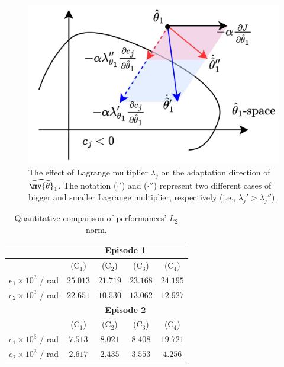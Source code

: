 \documentclass[lettersize,journal]{IEEEtran}
\begin{document}
\begin{figure}[!t]
	\centering
	\includegraphics[width=0.6\linewidth]{
		src/figures/lambda_effect.drawio.pdf
		}
	\caption{
		The effect of Lagrange multiplier $\lambda_{j}$ on the adaptation direction of $\widehat{ \mv{\theta}}_1$.
		The notation ($\cdot'$) and ($\cdot''$) represent two different cases of bigger and smaller Lagrange multiplier, respectively (i.e., $\lambda_{j}' > \lambda_{j}''$).
	}
	\label{fig:lambda_effect}
\end{figure}

\begin{table}[!t]
    \renewcommand{\arraystretch}{1.3}
    \caption{Quantitative comparison of performances' $L_2$ norm.}
    \centering
    \begin{tabular}{c c c c c}
    \hline
		& \multicolumn{4}{c}{\textbf{Episode 1}} \\
    \hline
	\hline 
		& (C$_1$) & (C$_2$) & (C$_3$) & (C$_4$) \\
	\hline
		$e_1\times10^{3}$ / rad & $25.013$ & $21.719$ & $23.168$ & $24.195$ \\
	\hline
        $e_2\times10^{3}$ / rad & $22.651$ & $10.530$ & $13.062$ & $12.927$ \\
	\hline
        & \multicolumn{4}{c}{\textbf{Episode 2}} \\
    \hline
    \hline
        & (C$_1$) & (C$_2$) & (C$_3$) & (C$_4$) \\
	\hline
		$e_1\times10^{3}$ / rad & $7.513$ & $8.021$ & $8.408$ & $19.721$ \\
	\hline
        $e_2\times10^{3}$ / rad & $2.617$ & $2.435$ & $3.553$ & $4.256$ \\
    \hline
    \end{tabular}
    \label{tab:sim:L2}
\end{table}
\end{document}
